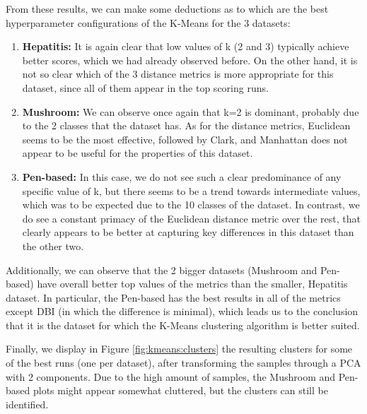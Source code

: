 From these results, we can make some deductions as to which are the best hyperparameter configurations of the K-Means for the 3 datasets:
\begin{enumerate}
    \item \textbf{Hepatitis:} It is again clear that low values of k (2 and 3) typically achieve better scores, which we had already observed before. On the other hand, it is not so clear which of the 3 distance metrics is more appropriate for this dataset, since all of them appear in the top scoring runs.
    \item \textbf{Mushroom:} We can observe once again that k=2 is dominant, probably due to the 2 classes that the dataset has. As for the distance metrics, Euclidean seems to be the most effective, followed by Clark, and Manhattan does not appear to be useful for the properties of this dataset.
    \item \textbf{Pen-based:} In this case, we do not see such a clear predominance of any specific value of k, but there seems to be a trend towards intermediate values, which was to be expected due to the 10 classes of the dataset. In contrast, we do see a constant primacy of the Euclidean distance metric over the rest, that clearly appears to be better at capturing key differences in this dataset than the other two.
\end{enumerate}
Additionally, we can observe that the 2 bigger datasets (Mushroom and Pen-based) have overall better top values of the metrics than the smaller, Hepatitis dataset. In particular, the Pen-based has the best results in all of the metrics except DBI (in which the difference is minimal), which leads us to the conclusion that it is the dataset for which the K-Means clustering algorithm is better suited.

Finally, we display in Figure \ref{fig:kmeans:clusters} the resulting clusters for some of the best runs (one per dataset), after transforming the samples through a PCA with 2 components. Due to the high amount of samples, the Mushroom and Pen-based plots might appear somewhat cluttered, but the clusters can still be identified.


